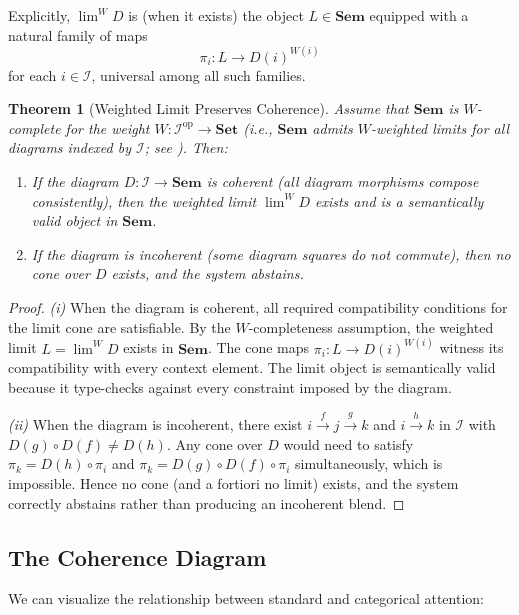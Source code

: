 \documentclass[11pt,a4paper]{article}
\theoremstyle{plain}
\newtheorem{theorem}{Theorem}[section]
\theoremstyle{definition}
\theoremstyle{remark}
\newcommand{\Sem}{\mathbf{Sem}}
\newcommand{\Set}{\mathbf{Set}}
\newcommand{\op}{\mathrm{op}}
\begin{document}
Explicitly, $\lim^W D$ is (when it exists) the object $L \in \Sem$ equipped with a natural family of maps
\[
  \pi_i : L \to D(i)^{W(i)}
\]
for each $i \in \mathcal{I}$, universal among all such families.

\begin{theorem}[Weighted Limit Preserves Coherence]\label{thm:limit-coherence}
Assume that $\Sem$ is $W$-complete for the weight $W : \mathcal{I}^{\op} \to \Set$ (i.e., $\Sem$ admits $W$-weighted limits for all diagrams indexed by $\mathcal{I}$; see ).
Then:
\begin{enumerate}[nosep,label=(\roman*)]
  \item If the diagram $D : \mathcal{I} \to \Sem$ is \emph{coherent} (all diagram morphisms compose consistently), then the weighted limit $\lim^W D$ exists and is a semantically valid object in $\Sem$.
  \item If the diagram is incoherent (some diagram squares do not commute), then no cone over $D$ exists, and the system abstains.
\end{enumerate}
\end{theorem}

\begin{proof}
\emph{(i)} When the diagram is coherent, all required compatibility conditions for the limit cone are satisfiable.
By the $W$-completeness assumption, the weighted limit $L = \lim^W D$ exists in $\Sem$.
The cone maps $\pi_i : L \to D(i)^{W(i)}$ witness its compatibility with every context element.
The limit object is semantically valid because it type-checks against every constraint imposed by the diagram.

\emph{(ii)} When the diagram is incoherent, there exist $i \xrightarrow{f} j \xrightarrow{g} k$ and $i \xrightarrow{h} k$ in $\mathcal{I}$ with $D(g) \circ D(f) \neq D(h)$.
Any cone over $D$ would need to satisfy $\pi_k = D(h) \circ \pi_i$ and $\pi_k = D(g) \circ D(f) \circ \pi_i$ simultaneously, which is impossible.
Hence no cone (and a fortiori no limit) exists, and the system correctly abstains rather than producing an incoherent blend.
\end{proof}

\subsection{The Coherence Diagram}

We can visualize the relationship between standard and categorical attention:
\end{document}
